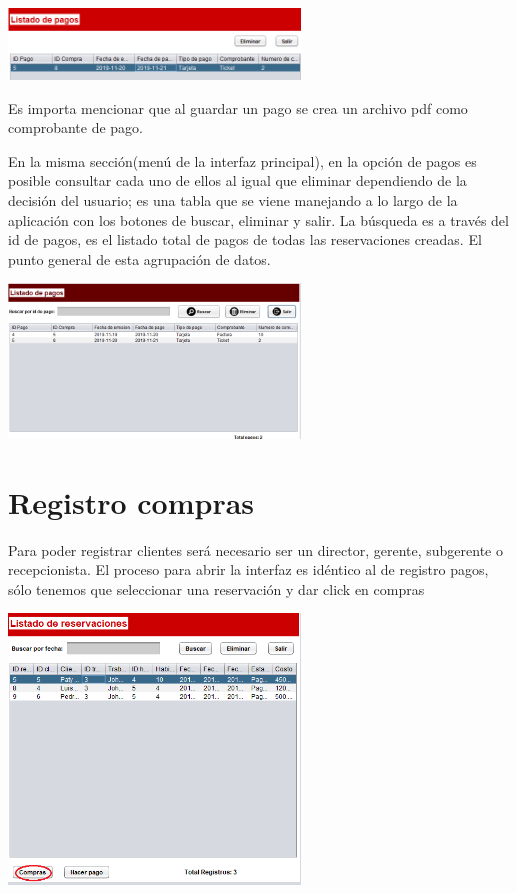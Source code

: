 \documentclass[12pt]{article}
\begin{document}
\begin{flushleft}
\vspace{0.5cm}
\begin{center}
\includegraphics[width=7.75cm]{pagos.png}
\end{center}
\vspace{0.5cm}

\textsf{Es importa mencionar que al guardar un pago se crea un archivo pdf como comprobante de pago.}

\vspace{0.5cm}
\textsf{En la misma sección(menú de la interfaz principal), en la opción de pagos es posible consultar cada uno de ellos al igual que eliminar dependiendo de la decisión del usuario; es una tabla que se viene manejando a lo largo de la aplicación con los botones de buscar, eliminar y salir. La búsqueda es a través del id de pagos, es el listado total de pagos de todas las reservaciones creadas. El punto general de esta agrupación de datos.}

\vspace{0.5cm}
\begin{center}
\includegraphics[width=7.75cm]{pagg.png}
\end{center}




\section{Registro compras}
\textsf{Para poder registrar clientes será necesario ser un director, gerente, subgerente o recepcionista. El proceso para abrir la interfaz es idéntico al de registro pagos, sólo tenemos que seleccionar una reservación y dar click en compras}

\vspace{0.5cm}
\begin{center}
\includegraphics[width=7.75cm]{compras.png}
\end{center}


\end{flushleft}
\end{document}
